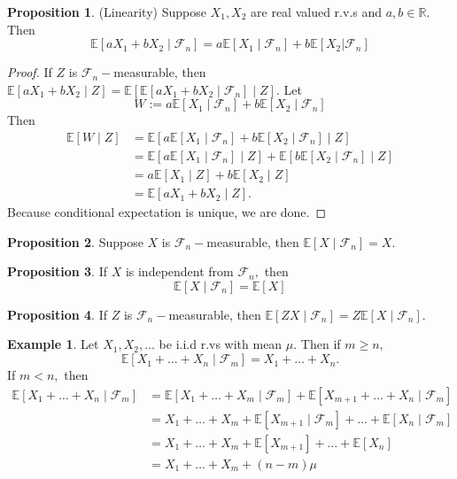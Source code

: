 \documentclass[10pt, oneside]{article}
\newcommand{\bbR}{\mathbb{R}}
\newcommand{\bbE}{\mathbb{E}}
\theoremstyle{definition}
\newtheorem{exmp}{Example}[section]
\newtheorem{prop}{Proposition}
\begin{document}
\begin{prop}(Linearity) Suppose $X_1, X_2$ are real valued r.v.s and $a,b \in \bbR.$ Then 
\[\bbE[aX_1 + bX_2 \mid \mathcal{F}_n] =  a\bbE[X _1 \mid \mathcal{F}_n] +  b\bbE[ X_2 | \mathcal{F}_n]\]
\end{prop}
\begin{proof}
    If $Z$ is $\mathcal{F}_n-$measurable, then  $\bbE[aX_1 + bX_2 \mid Z] = \bbE[\bbE[aX_1 + bX_2 \mid \mathcal{F}_n] \mid Z].$ Let
    \[W:= a\bbE[X_1 \mid \mathcal{F}_n] + b\bbE[X_2 \mid \mathcal{F}_n]\] Then 
    \begin{align*}
        \bbE[W \mid Z] &= \bbE[a \bbE[X_1 \mid \mathcal{F}_n] + b\bbE[X_2 \mid \mathcal{F}_n] \mid Z]\\
        &= \bbE[a \bbE[X_1 \mid \mathcal{F}_n]\mid Z] + \bbE[b\bbE[X_2 \mid \mathcal{F}_n]\mid Z]\\
        &= a\bbE[X_1 \mid Z] + b\bbE[X_2 \mid Z]\\
        &= \bbE[aX_1 + bX_2 \mid Z].
    \end{align*}
    Because conditional expectation is unique, we are done.
\end{proof}
\begin{prop}
    Suppose $X$ is $\mathcal{F}_n-$measurable, then $\bbE[X \mid \mathcal{F}_n] = X.$
\end{prop}
\begin{prop}
    If $X$ is independent from $\mathcal{F}_n,$ then 
    \[\bbE[X \mid \mathcal{F}_n] = \bbE[X]\]
\end{prop}
\begin{prop}
    If $Z$ is $\mathcal{F}_n-$measurable, then 
    $\bbE[ZX \mid \mathcal{F}_n] = Z\bbE[X \mid \mathcal{F}_n].$
\end{prop}
\begin{exmp}
    Let $X_1, X_2,\dots$ be i.i.d r.vs with mean $\mu.$ Then if $m\geq n,$ 
    \[\bbE[X_1  + \dots  + X_n \mid \mathcal{F}_m] = X_1 + \dots + 
 X_n.\] If $m < n,$ then 
 \begin{align*}
  \bbE[X_1 + \dots + X_n \mid \mathcal{F}_m] &= \bbE[X_1 + \dots 
 + X_m \mid \mathcal{F}_m] + \bbE[X_{m+1} + \dots + X_n \mid \mathcal{F}_m]   \\
 &= X_1 + \dots + X_m + \bbE[X_{m+1} \mid \mathcal{F}_m] + \dots  + \bbE[X_n \mid \mathcal{F}_m]\\
 &= X_1 + \dots + X_m + \bbE[X_{m+1}] + \dots  + \bbE[X_n ]\\
 &= X_1 + \dots + X_m + (n-m)\mu
 \end{align*}
 
\end{exmp}
\end{document}
